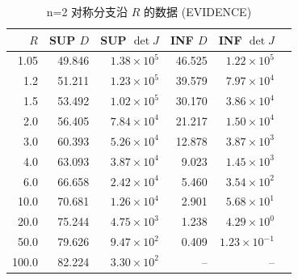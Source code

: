 \documentclass[UTF8]{ctexart}
\begin{document}
\begin{table}[ht]
\centering
\caption{n=2 对称分支沿 $R$ 的数据 (EVIDENCE)}
\begin{tabular}{rrrrrr}
\toprule
$R$ & SUP $D$ & SUP $\det J$ & INF $D$ & INF $\det J$ \\
\midrule
1.05 & 49.846 & $1.38\times10^5$ & 46.525 & $1.22\times10^5$ \\
1.2  & 51.211 & $1.23\times10^5$ & 39.579 & $7.97\times10^4$ \\
1.5  & 53.492 & $1.02\times10^5$ & 30.170 & $3.86\times10^4$ \\
2.0  & 56.405 & $7.84\times10^4$ & 21.217 & $1.50\times10^4$ \\
3.0  & 60.393 & $5.26\times10^4$ & 12.878 & $3.87\times10^3$ \\
4.0  & 63.093 & $3.87\times10^4$ & 9.023  & $1.45\times10^3$ \\
6.0  & 66.658 & $2.42\times10^4$ & 5.460  & $3.54\times10^2$ \\
10.0 & 70.681 & $1.26\times10^4$ & 2.901  & $5.68\times10^1$ \\
20.0 & 75.244 & $4.75\times10^3$ & 1.238  & $4.29\times10^0$ \\
50.0 & 79.626 & $9.47\times10^2$ & 0.409  & $1.23\times10^{-1}$ \\
100.0& 82.224 & $3.30\times10^2$ & -- & -- \\
\bottomrule
\end{tabular}
\end{table}
\end{document}
